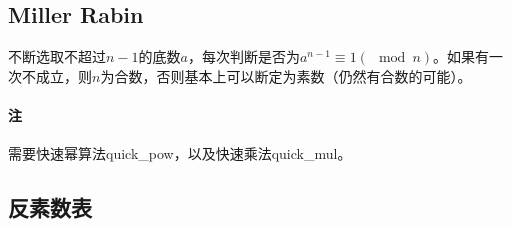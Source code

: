 

\subsection{Miller Rabin}

不断选取不超过$n-1$的底数$a$，每次判断是否为$a^{n-1}\equiv 1(\mod n)$。如果有一次不成立，则$n$为合数，否则基本上可以断定为素数（仍然有合数的可能）。

\paragraph{注} 需要快速幂算法quick\_pow，以及快速乘法quick\_mul。



\subsection{反素数表}

